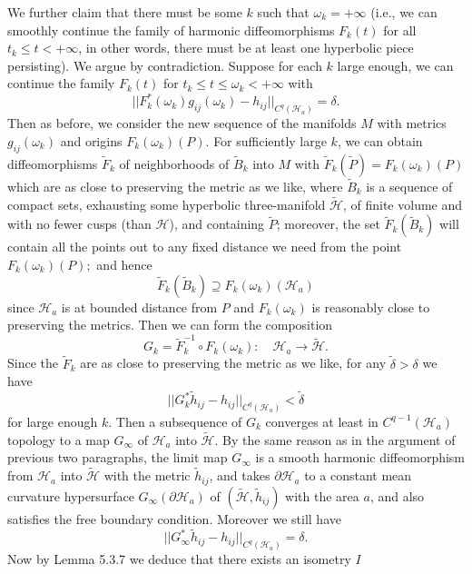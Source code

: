 We further claim that there must be some $k$ such that
$\omega_k=+\infty$ (i.e., we can smoothly continue the family of
harmonic diffeomorphisms $F_k(t)$ for all $t_k\le t<+\infty$, in
other words, there must be at least one hyperbolic piece
persisting). We argue by contradiction. Suppose for each $k$ large
enough, we can continue the family $F_k(t)$ for $t_k\le t\le
\omega_k<+\infty$ with
$$
||F^*_k(\omega_k)g_{ij}(\omega_k)-h_{ij}||_{C^q(\mathcal{H}_a)}
=\delta.
$$
Then as before, we consider the new sequence of the manifolds $M$
with metrics $g_{ij}(\omega_k)$ and origins $F_k(\omega_k)(P)$.
For sufficiently large $k$, we can obtain diffeomorphisms
$\widetilde{F}_k$ of neighborhoods of $\widetilde{B}_k$ into $M$
with $\widetilde{F}_k(\widetilde{P})=F_k(\omega_k)(P)$ which are
as close to preserving the metric as we like, where
$\widetilde{B}_k$ is a sequence of compact sets, exhausting some
hyperbolic three-manifold $\tilde{\mathcal{H}}$, of finite volume
and with no fewer cusps (than $\mathcal{H}$), and containing
$\tilde{P}$; moreover, the set $\widetilde{F}_k(\widetilde{B}_k)$
will contain all the points out to any fixed distance we need from
the point $F_k(\omega_k)(P);$ and hence
$$
\widetilde{F}_k(\widetilde{B}_k)\supseteq
F_k(\omega_k)(\mathcal{H}_a)
$$
since $\mathcal{H}_a$ is at bounded distance from $P$ and
$F_k(\omega_k)$ is reasonably close to preserving the metrics.
Then we can form the composition
$$
G_k=\widetilde{F}^{-1}_k\circ F_k(\omega_k):\quad
\mathcal{H}_a\rightarrow\tilde{\mathcal{H}}.
$$
Since the $\widetilde{F}_k$ are as close to preserving the metric
as we like, for any $\widetilde{\delta}>\delta$ we have
$$
||G^*_k\widetilde{h}_{ij}-h_{ij}||_{C^q(\mathcal{H}_a)}
<\widetilde{\delta}
$$
for large enough $k$. Then a subsequence of $G_k$ converges at
least in $C^{q-1}(\mathcal{H}_a)$ topology to a map $G_\infty$ of
$\mathcal{H}_a$ into $\widetilde{\mathcal{H}}$. By the same reason
as in the argument of previous two paragraphs, the limit map
$G_\infty$ is a smooth harmonic diffeomorphism from
$\mathcal{H}_a$ into $\widetilde{\mathcal{H}}$ with the metric
$\tilde{h}_{ij}$, and takes $\partial \mathcal{H}_a$ to a constant
mean curvature hypersurface $G_\infty(\partial \mathcal{H}_a)$ of
$(\tilde{\mathcal{H}},\widetilde{h}_{ij})$ with the area $a$, and
also satisfies the free boundary condition. Moreover we still have
\begin{equation} ||G^*_\infty\widetilde{h}_{ij}-h_{ij}||_{C^q(\mathcal{H}_a)}
=\delta. %
\end{equation} Now by Lemma 5.3.7 we deduce that there exists an isometry $I$
